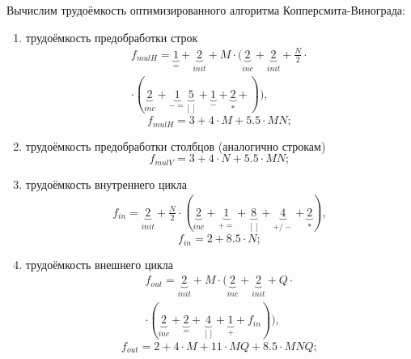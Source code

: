 Вычислим трудоёмкость оптимизированного алгоритма Копперсмита-Винограда:
\begin{enumerate}
	\item трудоёмкость предобработки строк
	\begin{equation}
		\begin{gathered}
			f_{mulH} = \underbrace{1}_{=} + \underbrace{2}_{init} + M \cdot (\underbrace{2}_{inc} + \underbrace{2}_{init} + \frac{N}{2} \cdot \\
			\cdot (\underbrace{2}_{inc} + \underbrace{1}_{-=} \underbrace{5}_{[]} + \underbrace{1}_{-} +\underbrace{2}_{*} + )),
		\end{gathered}
	\end{equation}
	\begin{equation}
		f_{mulH} = 3 + 4 \cdot M + 5.5 \cdot MN;
	\end{equation}
	
	\item трудоёмкость предобработки столбцов (аналогично строкам)
	\begin{equation}
		f_{mulV} = 3 + 4 \cdot N + 5.5 \cdot MN;
	\end{equation}
	
	\item трудоёмкость внутреннего цикла
	\begin{equation}
		\begin{gathered}
			f_{in} = \underbrace{2}_{init} + \frac{N}{2} \cdot (\underbrace{2}_{inc} + \underbrace{1}_{+=} + \underbrace{8}_{[]} + \underbrace{4}_{+/-} + \underbrace{2}_{*}),
		\end{gathered}
	\end{equation}
	\begin{equation}
		f_{in} = 2 + 8.5 \cdot N;
	\end{equation}
	
	\item трудоёмкость внешнего цикла
	\begin{equation}
		\begin{gathered}
			f_{out} = \underbrace{2}_{init} + M \cdot (\underbrace{2}_{inc} + \underbrace{2}_{init} + Q \cdot \\ 
			\cdot (\underbrace{2}_{inc} + \underbrace{2}_{=} + \underbrace{4}_{[]} + \underbrace{1}_{+} + f_{in})),
		\end{gathered}
	\end{equation}
	\begin{equation}
		f_{out} = 2 + 4 \cdot M + 11 \cdot MQ + 8.5 \cdot MNQ;
	\end{equation}
	

\end{enumerate}
